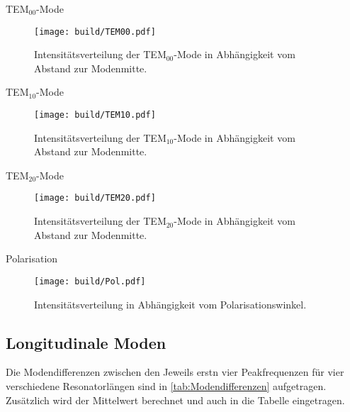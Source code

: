 TEM$_{00}$-Mode

\begin{figure}[H]
  \centering
  \texttt{[image: build/TEM00.pdf]}
  \caption {Intensitätsverteilung der TEM$_{00}$-Mode in Abhängigkeit vom Abstand zur Modenmitte.}
  \label{fig:TEM00}
\end{figure}

TEM$_{10}$-Mode

\begin{figure}[H]
  \centering
  \texttt{[image: build/TEM10.pdf]}
  \caption {Intensitätsverteilung der TEM$_{10}$-Mode in Abhängigkeit vom Abstand zur Modenmitte.}
  \label{fig:TEM10}
\end{figure}

TEM$_{20}$-Mode

\begin{figure}[H]
  \centering
  \texttt{[image: build/TEM20.pdf]}
  \caption {Intensitätsverteilung der TEM$_{20}$-Mode in Abhängigkeit vom Abstand zur Modenmitte.}
  \label{fig:TEM20}
\end{figure}


Polarisation

\begin{figure}[H]
  \centering
  \texttt{[image: build/Pol.pdf]}
  \caption {Intensitätsverteilung in Abhängigkeit vom Polarisationswinkel.}
  \label{fig:Pol}
\end{figure}






\subsection{Longitudinale Moden}
\label{sub:Longitudinale Moden}

Die Modendifferenzen zwischen den Jeweils erstn vier Peakfrequenzen für vier verschiedene Resonatorlängen sind in \autoref{tab:Modendifferenzen}
aufgetragen. Zusätzlich wird der Mittelwert berechnet und auch in die Tabelle eingetragen.

